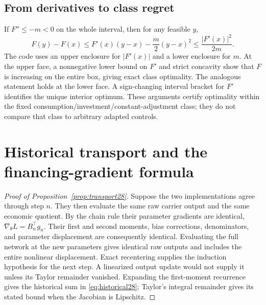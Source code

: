 \subsection{From derivatives to class regret}
If $F''\le-m<0$ on the whole interval, then for any feasible $y$,
\begin{equation}
 F(y)-F(x)\le F'(x)(y-x)-\frac m2(y-x)^2\le\frac{|F'(x)|^2}{2m}.
\end{equation}
The code uses an upper enclosure for $|F'(x)|$ and a lower enclosure for $m$. At the upper face, a nonnegative lower bound on $F'$ and strict concavity show that $F$ is increasing on the entire box, giving exact class optimality. The analogous statement holds at the lower face. A sign-changing interval bracket for $F'$ identifies the unique interior optimum. These arguments certify optimality within the fixed consumption/investment/constant-adjustment class; they do not compare that class to arbitrary adapted controls.

\section{Historical transport and the financing-gradient formula}\label{app:transport28}
\begin{proof}[Proof of Proposition~\ref{prop:transport28}]
Suppose the two implementations agree through step $n$. They then evaluate the same raw carrier output and the same economic quotient. By the chain rule their parameter gradients are identical, $\nabla_\theta L=B_n^\top g_n$. Their first and second moments, bias corrections, denominators, and parameter displacement are consequently identical. Evaluating the full network at the new parameters gives identical raw outputs and includes the entire nonlinear displacement. Exact recentering supplies the induction hypothesis for the next step. A linearized output update would not supply it unless its Taylor remainder vanished. Expanding the first-moment recurrence gives the historical sum in \eqref{eq:historical28}; Taylor's integral remainder gives its stated bound when the Jacobian is Lipschitz.
\end{proof}

